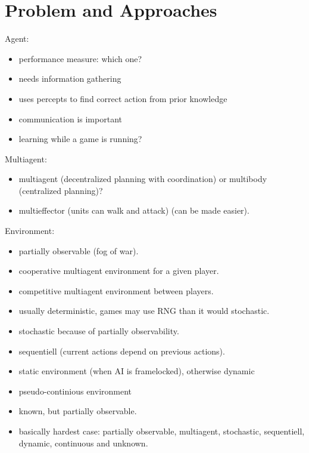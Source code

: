 
\chapter{Problem and Approaches}
\label{ch:ProblemApproaches}

Agent:
\begin{itemize}[noitemsep,nolistsep]
    \item performance measure: which one?
    \item needs information gathering
    \item uses percepts to find correct action from prior knowledge
    \item communication is important
    \item learning while a game is running?
\end{itemize}
\medskip
Multiagent:
\begin{itemize}[noitemsep,nolistsep]
    \item multiagent (decentralized planning with coordination) or multibody (centralized planning)?
    \item multieffector (units can walk and attack) (can be made easier).
\end{itemize}
\medskip
Environment:
\begin{itemize}[noitemsep,nolistsep]
    \item partially observable (fog of war).
    \item cooperative multiagent environment for a given player.
    \item competitive multiagent environment between players.
    \item usually deterministic, games may use RNG than it would stochastic.
    \item stochastic because of partially observability.
    \item sequentiell  (current actions depend on previous actions).
    \item static environment (when AI is framelocked), otherwise dynamic
    \item pseudo-continious environment
    \item known, but partially observable.
    \item basically hardest case: partially observable, multiagent, stochastic, sequentiell, dynamic, continuous and unknown.
\end{itemize}

